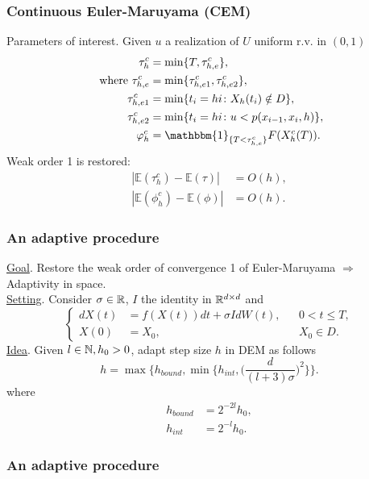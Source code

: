 \begin{frame}
\frametitle{Continuous Euler-Maruyama (CEM)}
Parameters of interest. Given $u$ a realization of $U$ uniform r.v. in $(0,1)$
\begin{equation*}
\begin{aligned}
	\tau_h^c &= \min \{T,\tau_{h,e}^c\}, \\
	\text{ where } \tau_{h,e}^c &= \min\{\tau_{h,e1}^c, \tau_{h,e2}^c\}, \\
	\tau_{h,e1}^c &= \min\{t_i = hi \colon X_h(t_i) \notin D\}, \\
	\tau_{h,e2}^c &= \min\{t_i = hi \colon u < p(x_{i-1},x_i,h) \}, \\
	\phi_h^c &= \mathbbm{1}_{\{T < \tau_{h,e}^c\}}F(X_h^c(T)).
\end{aligned}
\end{equation*}
Weak order 1 is restored:
\begin{align*}
	|\mathbb{E}(\tau_h^c) - \mathbb{E}(\tau)| &= O(h), \\
	|\mathbb{E}(\phi_h^c) - \mathbb{E}(\phi)| &= O(h).
\end{align*}
\end{frame}

\begin{frame} %
\frametitle{An adaptive procedure}
\underline{Goal}. Restore the weak order of convergence 1 of Euler-Maruyama $\Rightarrow$ Adaptivity in space. \\
\underline{Setting}. Consider $\sigma \in \mathbb{R}$, $I$ the identity in $\mathbb{R}^{d \times d}$ and
\begin{equation*}
\left \{
\begin{aligned}
	dX(t) &= f(X(t)) dt + \sigma I dW(t), && 0 < t \leq T, \\
	X(0)  &= X_0, && X_0 \in D.
\end{aligned} \right .
\end{equation*}
\underline{Idea}. Given $l \in \mathbb{N}, h_0 > 0$, adapt step size $h$ in DEM as follows
\begin{equation*}
	h = \max\Big\{ h_{bound}, \min\Big\{ h_{int}, \Big(\frac{d}{(l + 3)\sigma}\Big)^2\Big\}\Big\}.
\end{equation*}
where
\begin{equation*}
\begin{aligned}
	h_{bound} &= 2^{-2l}h_0, \\
	h_{int} &= 2^{-l}h_0.
\end{aligned}
\end{equation*}
\end{frame}

\begin{frame}
\frametitle{An adaptive procedure}

\end{frame}



